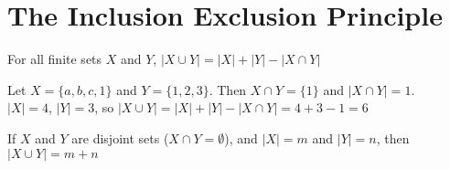 \documentclass[../notes.tex]{subfiles}
\begin{document}
		\section{The Inclusion Exclusion Principle}
			\begin{theorem}
				For all finite sets $X$ and $Y$, $\left\lvert X \cup Y\right\rvert = \left\lvert X\right\rvert + \left\lvert Y \right\rvert - \left\lvert X \cap Y\right\rvert $
			\end{theorem}
			\begin{example}
				Let $X = \{a, b, c, 1\}$ and $Y = \{1, 2, 3\}$. Then $X \cap Y = \{1\}$ and $\left\lvert X \cap Y\right\rvert = 1$.\\
				$\left\lvert X\right\rvert = 4$, $\left\lvert Y\right\rvert = 3$, so $\left\lvert X \cup Y\right\rvert = \left\lvert X\right\rvert + \left\lvert Y\right\rvert - \left\lvert X \cap Y\right\rvert = 4 + 3 - 1 = 6$
			\end{example}
			\begin{theorem}
				If $X$ and $Y$ are disjoint sets ($X \cap Y = \emptyset$), and $\left\lvert X\right\rvert = m$ and $\left\lvert Y\right\rvert = n $, then $\left\lvert X \cup Y\right\rvert = m + n $
			\end{theorem}
\end{document}
